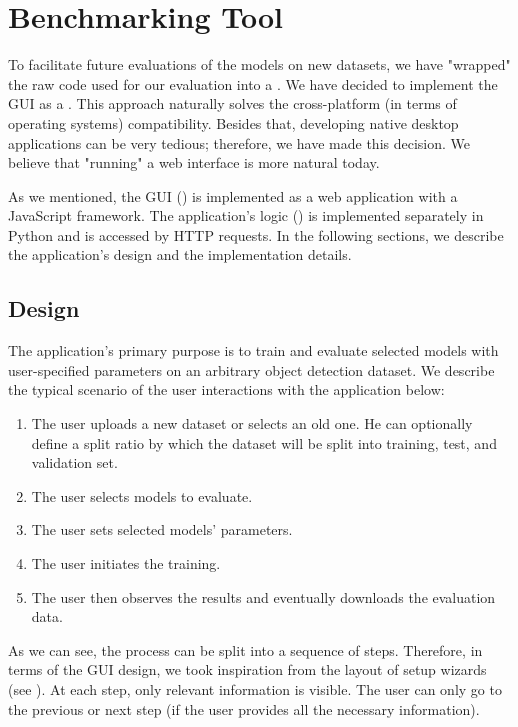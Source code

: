 \chapter{Benchmarking Tool}\label{chap:tool}
To facilitate future evaluations of the models on new datasets, we have
"wrapped" the raw code used for our evaluation into a . We have decided to implement the GUI as a
. This approach naturally solves the cross-platform (in
terms of operating systems) compatibility. Besides that, developing native
desktop applications can be very tedious; therefore, we have made this decision.
We believe that "running" a web interface is more natural today.

As we mentioned, the GUI () is implemented as a web application
with a JavaScript framework. The application's logic () is
implemented separately in Python and is accessed by HTTP requests. In the
following sections, we describe the application's design and the implementation
details.

\section{Design}
The application's primary purpose is to train and evaluate selected models with
user-specified parameters on an arbitrary object detection dataset. We describe
the typical scenario of the user interactions with the application below:
\renewcommand{\theenumi}{\arabic{enumi}}
\begin{enumerate}
    \item The user uploads a new dataset or selects an old one. He can
          optionally define a split ratio by which the dataset will be split
          into training, test, and validation set.
    \item The user selects models to evaluate.
    \item The user sets selected models' parameters.
    \item The user initiates the training.
    \item The user then observes the results and eventually downloads the
          evaluation data.
\end{enumerate}
As we can see, the process can be split into a sequence of steps. Therefore, in
terms of the GUI design, we took inspiration from the layout of setup wizards
(see ). At each step, only relevant information is
visible. The user can only go to the previous or next step (if the user provides
all the necessary information).

